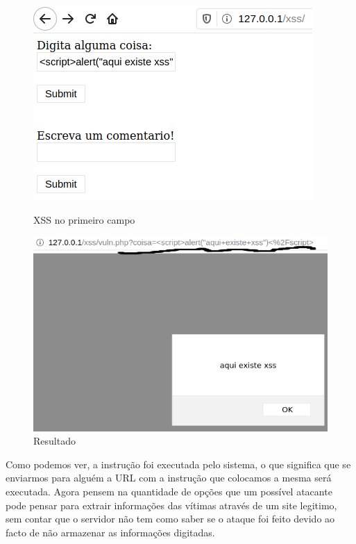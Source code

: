 \documentclass{report}
\begin{document}
\begin{figure}[!htb]
  \includegraphics[width=\linewidth]{imagessql/Fig11.png}
  \caption{XSS no primeiro campo}\label{XSS no primeiro campo}
\endminipage\hfill
{}
  \includegraphics[width=\linewidth]{imagessql/Fig12.png}
  \caption{Resultado}\label{fig:resultado}
\endminipage
\end{figure}

Como podemos ver, a instrução foi executada pelo sistema, o que significa que se enviarmos para alguém a URL com a instrução que colocamos a mesma será executada. Agora pensem na quantidade de opções que um possível atacante pode pensar para extrair informações das vítimas através de um site legitimo, sem contar que o servidor não tem como saber se o ataque foi feito devido ao facto de não armazenar as informações digitadas.
\clearpage
\end{document}
